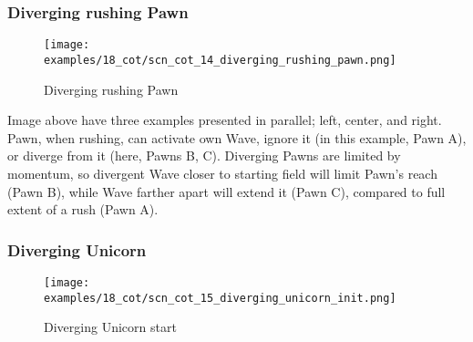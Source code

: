 \clearpage %

\subsubsection*{Diverging rushing Pawn}
\label{sec:Conquest of Tlalocan/Shaman/Divergence/Diverging rushing Pawn}

\vspace*{-1.4\baselineskip}
\noindent
\begin{figure}[!h]
\texttt{[image: examples/18\_cot/scn\_cot\_14\_diverging\_rushing\_pawn.png]}
\vspace*{-1.3\baselineskip}
\caption{Diverging rushing Pawn}
\label{fig:scn_cot_14_diverging_rushing_pawn}
\end{figure}

\vspace*{-0.4\baselineskip}
Image above have three examples presented in parallel; left, center, and right. Pawn,
when rushing, can activate own Wave, ignore it (in this example, Pawn A), or diverge
from it (here, Pawns B, C). Diverging Pawns are limited by momentum, so divergent Wave
closer to starting field will limit Pawn's reach (Pawn B), while Wave farther apart
will extend it (Pawn C), compared to full extent of a rush (Pawn A).

\clearpage %

\subsubsection*{Diverging Unicorn}
\label{sec:Conquest of Tlalocan/Shaman/Divergence/Diverging Unicorn}

\vspace*{-1.4\baselineskip}
\noindent
\begin{figure}[!h]
\texttt{[image: examples/18\_cot/scn\_cot\_15\_diverging\_unicorn\_init.png]}
\vspace*{-1.3\baselineskip}
\caption{Diverging Unicorn start}
\label{fig:scn_cot_15_diverging_unicorn_init}
\end{figure}


